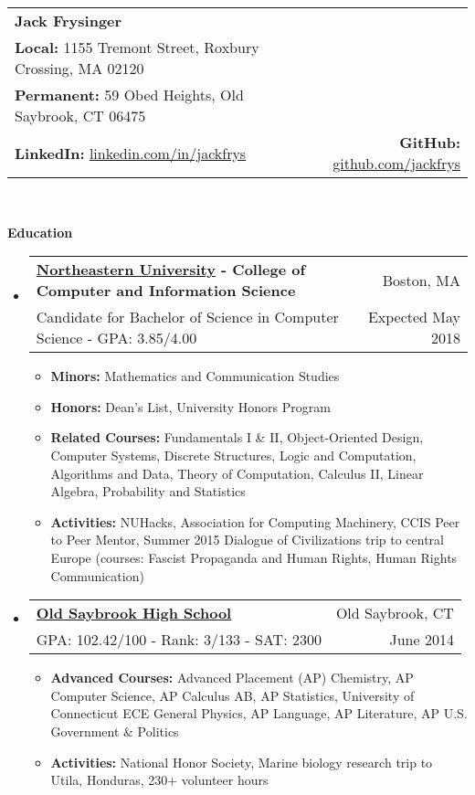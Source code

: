 \documentclass[letterpaper,10.6pt]{article}
\makeatletter
\newcommand{\resitem}[1]{\item #1 \vspace{-2pt}}
\newcommand{\resheading}[1]{{\large \colorbox{mygrey}{\begin{minipage}{\textwidth}{\textbf{#1 \vphantom{p\^{E}}}}\end{minipage}}}}
\newcommand{\ressubheading}[4]{
\begin{tabular*}{6.8in}{l@{\extracolsep{\fill}}r}
		\textbf{#1} & #2 \\
		\small{#3} & \small{#4} \\
\end{tabular*}\vspace{-6pt}}
\makeatother
\begin{document}
\newcommand{\mywebheader}{
\begin{tabular*}{7in}{l@{\extracolsep{\fill}}r}
	\textbf{\LARGE Jack Frysinger} &
	\\
	\textbf{Local:} 1155 Tremont Street, Roxbury Crossing, MA 02120 &
	\\\textbf{Permanent:} 59 Obed Heights, Old Saybrook, CT 06475 &
	\\
	\textbf{LinkedIn:} \href{http://linkedin.com/in/jackfrys}{linkedin.com/in/jackfrys} & \textbf{GitHub:} \href{https://github.com/jackfrys}{github.com/jackfrys}
	\end{tabular*}
\\
\vspace{0.1in}}

\mywebheader

\resheading{Education}
	\begin{itemize}[leftmargin=*]
		\item[]
			\ressubheading{\href{http://www.northeastern.edu}{Northeastern University} - College of Computer and Information Science}{Boston, MA}{{Candidate for Bachelor of Science in Computer Science - }{GPA: 3.85/4.00}}{Expected May 2018}
				{ \footnotesize
				\begin{itemize}
					\resitem{\textbf{Minors:} Mathematics and Communication Studies}
					\resitem{\textbf{Honors:} Dean's List, University Honors Program}
					\resitem{\textbf{Related Courses:} Fundamentals I \& II, Object-Oriented Design, Computer Systems, Discrete Structures, Logic and Computation, Algorithms and Data, Theory of Computation, Calculus II, Linear Algebra, Probability and Statistics}
					\resitem{\textbf{Activities:} NUHacks, Association for Computing Machinery, CCIS Peer to Peer Mentor, Summer 2015 Dialogue of Civilizations trip to central Europe (courses: Fascist Propaganda and Human Rights, Human Rights Communication)}
				\end{itemize}}
		\item[]
			\ressubheading{\href{http://www.oldsaybrookschools.org/page.cfm?p=605}{Old Saybrook High School}}{Old Saybrook, CT}{{GPA: 102.42/100 - Rank: 3/133 - SAT: 2300}}{June 2014}
			{\footnotesize
			\begin{itemize}
				\resitem{\textbf{Advanced Courses:} Advanced Placement (AP) Chemistry, AP Computer Science, AP Calculus AB, AP Statistics, University of Connecticut ECE General Physics, AP Language, AP Literature, AP U.S. Government \& Politics}
				\resitem{\textbf{Activities:} National Honor Society, Marine biology research trip to Utila, Honduras, 230+ volunteer hours}
			\end{itemize}}
	\end{itemize} %
	
\end{document}
